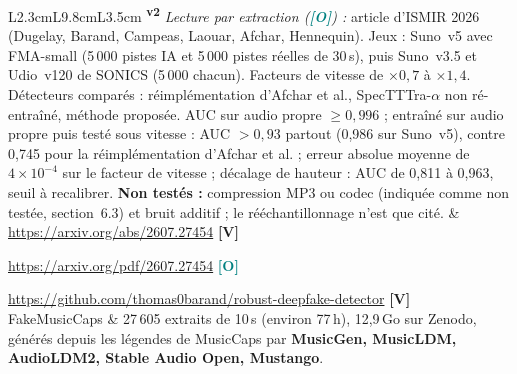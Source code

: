 \documentclass[11pt,a4paper]{article}
\newcommand{\vtwo}{\textsuperscript{\textcolor{orange!80!black}{\textbf{v2}}}}
\newcommand{\lV}{\textbf{\textcolor{green!45!black}{[V]}}}
\newcommand{\lO}{\textbf{\textcolor{teal}{[O]}}}
\begin{document}
{\begin{longtable}{L{2.3cm}L{9.8cm}L{3.5cm}}
\vtwo{} \textit{Lecture par extraction (\lO) :} article d'ISMIR 2026 (Dugelay, Barand, Campeas, Laouar, Afchar, Hennequin). Jeux : Suno~v5 avec FMA-small (5\,000 pistes IA et 5\,000 pistes réelles de 30\,s), puis Suno~v3.5 et Udio~v120 de SONICS (5\,000 chacun). Facteurs de vitesse de $\times0{,}7$ à $\times1{,}4$. Détecteurs comparés : réimplémentation d'Afchar et al., SpecTTTra-$\alpha$ non ré-entraîné, méthode proposée. AUC sur audio propre $\ge0{,}996$ ; entraîné sur audio propre puis testé sous vitesse : AUC $>0{,}93$ partout (0,986 sur Suno~v5), contre 0,745 pour la réimplémentation d'Afchar et al. ; erreur absolue moyenne de $4\times10^{-4}$ sur le facteur de vitesse ; décalage de hauteur : AUC de 0,811 à 0,963, seuil à recalibrer. \textbf{Non testés :} compression MP3 ou codec (indiquée comme non testée, section~6.3) et bruit additif ; le rééchantillonnage n'est que cité. &
\url{https://arxiv.org/abs/2607.27454} \lV\par \url{https://arxiv.org/pdf/2607.27454} \lO\par \url{https://github.com/thomas0barand/robust-deepfake-detector} \lV\\
\addlinespace
FakeMusicCaps &
27\,605 extraits de 10\,s (environ 77\,h), 12,9\,Go sur Zenodo, générés depuis les légendes de MusicCaps par \textbf{MusicGen, MusicLDM, AudioLDM2, Stable Audio Open, Mustango}.


\end{longtable}}
\end{document}
